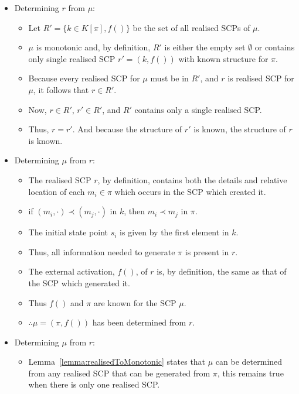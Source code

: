 \begin{bulletProof} \label{proof:monorealisedandback}
\begin{itemize}
\item Determining $r$ from $\mu$:
\begin{itemize}
\item Let $R'=\{k \in K[\pi],f()\}$ be the set of all realised SCPs of $\mu$.
\item $\mu$ is monotonic and, by definition, $R'$ is either the empty set $\emptyset$ or contains only single realised SCP $r'=(k,f())$ with known structure for $\pi$.
\item Because every realised SCP for $\mu$ must be in $R'$, and $r$ is realised SCP for $\mu$, it follows that $r \in R'$.
\item Now, $r \in R'$, $r' \in R'$, and $R'$ contains only a single realised SCP.
\item Thus, $r=r'$. And because the structure of $r'$ is known, the structure of $r$ is known.
\end{itemize}
\end{itemize}

\begin{itemize}
\item Determining $\mu$ from $r$:
\begin{itemize}
\item The realised SCP $r$, by definition, contains both the details and relative location of each $m_i \in \pi$ which occurs in the SCP which created it.
\item if $(m_i,\cdot) \prec (m_j,\cdot)$ in $k$, then $m_i \prec m_j$ in $\pi$.
\item The initial state point $s_i$ is given by the first element in $k$.
\item Thus, all information needed to generate $\pi$ is present in $r$.
\item The external activation, $f()$, of $r$ is, by definition, the same as that of the SCP which generated it.
\item Thus $f()$ and $\pi$ are known for the SCP $\mu$.
\item $\therefore \mu=(\pi,f())$ has been determined from $r$.
\end{itemize}
\item Determining $\mu$ from $r$:
\begin{itemize}
\item Lemma~\ref{lemma:realisedToMonotonic} states that $\mu$ can be determined from any realised SCP that can be generated from $\pi$, this remains true when there is only one realised SCP.
\end{itemize}
\end{itemize}

\end{bulletProof}

